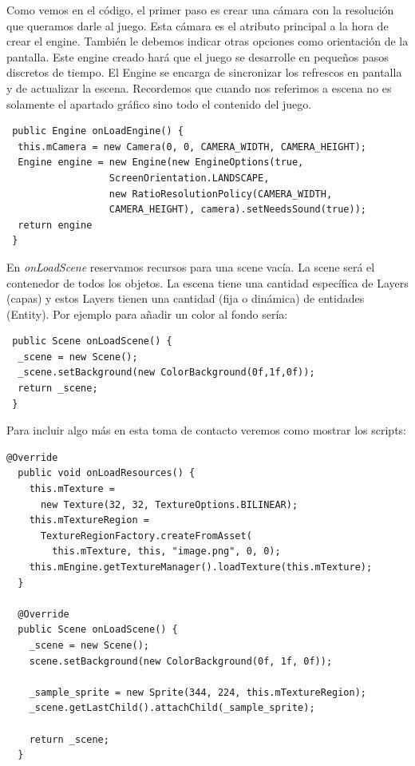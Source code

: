 \documentclass[12 pt, a4paper, twoside]{article}
\begin{document}
Como vemos en el código, el primer paso es crear una cámara con la
resolución que queramos darle al juego. Esta cámara es el atributo
principal a la hora de crear el engine. También le debemos indicar
otras opciones como orientación de la pantalla.
Este engine creado hará que el juego se desarrolle en pequeños pasos
discretos de tiempo. El Engine se encarga de sincronizar los refrescos
en pantalla y de actualizar la escena. Recordemos que cuando nos
referimos a escena no es solamente el apartado gráfico sino todo el
contenido del juego.

\begin{verbatim}
 public Engine onLoadEngine() {
  this.mCamera = new Camera(0, 0, CAMERA_WIDTH, CAMERA_HEIGHT);
  Engine engine = new Engine(new EngineOptions(true,
                  ScreenOrientation.LANDSCAPE,
                  new RatioResolutionPolicy(CAMERA_WIDTH,
                  CAMERA_HEIGHT), camera).setNeedsSound(true));
  return engine
 }
\end{verbatim}

En \emph{onLoadScene} reservamos recursos para una scene vacía. La
scene será el contenedor de todos los objetos. La escena tiene una
cantidad específica de Layers (capas) y estos Layers tienen una
cantidad (fija o dinámica) de entidades (Entity). Por ejemplo para
añadir un color al fondo sería:

\begin{verbatim}
 public Scene onLoadScene() {
  _scene = new Scene();
  _scene.setBackground(new ColorBackground(0f,1f,0f));
  return _scene;
 }
\end{verbatim}

Para incluir algo más en esta toma de contacto veremos como mostrar
los scripts:

\begin{verbatim}
@Override
  public void onLoadResources() {
    this.mTexture =
      new Texture(32, 32, TextureOptions.BILINEAR);
    this.mTextureRegion =
      TextureRegionFactory.createFromAsset(
        this.mTexture, this, "image.png", 0, 0);
    this.mEngine.getTextureManager().loadTexture(this.mTexture);
  }

  @Override
  public Scene onLoadScene() {
    _scene = new Scene();
    scene.setBackground(new ColorBackground(0f, 1f, 0f));

    _sample_sprite = new Sprite(344, 224, this.mTextureRegion);
    _scene.getLastChild().attachChild(_sample_sprite);

    return _scene;
  }
\end{verbatim}
\end{document}

